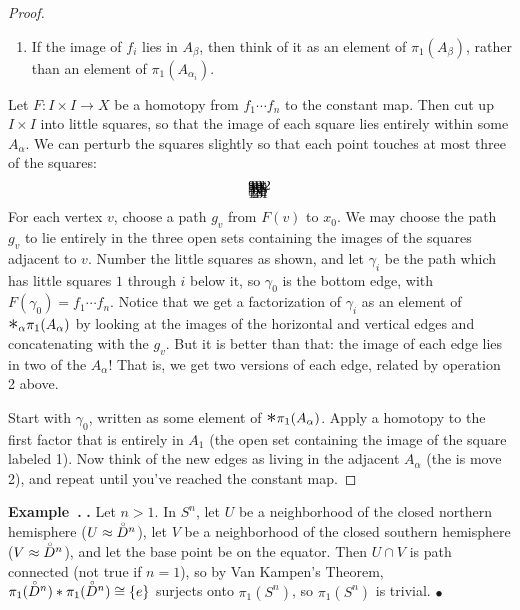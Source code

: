 \documentclass[12pt]{article}
\makeatletter
\theoremstyle{plain}
\theoremstyle{definition}
\newenvironment{example}[1][]{%
    \begin{trivlist} \item[]%
    \refstepcounter{equation}\textbf{Example~\theequation}%
    \@ifnotempty{#1}{\the\thm@notefont \ (#1)}\textbf{.} }%
    {\hspace*{\fill}$\bullet$ \end{trivlist}}
\theoremstyle{remark}
\renewcommand{\theequation}{\thesection.\arabic{equation}}
\newcommand{\bigast}{\text{\Large $\ast$}}
\newcommand{\inn}[1]{\accentset{\circ}{#1}}
\makeatother
\begin{document}
\begin{proof}
\begin{enumerate}
     \item If the image of $f_i$ lies in $A_\beta$, then think of it as an element of
     $\pi_1(A_\beta)$, rather than an element of $\pi_1(A_{\alpha_i})$.
   \end{enumerate}
   Let $F:I\times I\to X$ be a homotopy from $f_1\cdots f_n$ to the constant map. Then
   cut up $I\times I$ into little squares, so that the image of each square lies entirely
   within some $A_\alpha$. We can perturb the squares slightly so that each point touches
   at most three of the squares:
   \[\begin{xy}
     (-1.5,-1) *{1} *=(1,1)\frm{-},
     (-.5,-1) *{2} *=(1,1)\frm{-},
     (.5,-1) *{3} *=(1,1)\frm{-},
     (1.5,-1) *{4} *=(1,1)\frm{-},
     (-1.5,0) *{5} *=(1.1,1)!(-.05,0)\frm{-},
     (-.4,0) *{6} *=(1,1)\frm{-},
     (.6,0) *{7} *=(1,1)\frm{-},
     (1.6,0) *{8} *=(.9,1)!(.05,0)\frm{-},
     (-1.5,1) *{9} *=(1,1)\frm{-},
     (-.5,1) *{10} *=(1,1)\frm{-},
     (.5,1) *{11} *=(1,1)\frm{-},
     (1.5,1) *{12} *=(1,1)\frm{-},
   \end{xy}\]
   For each vertex $v$, choose a path $g_v$ from $F(v)$ to $x_0$. We may choose the path
   $g_v$ to lie entirely in the three open sets containing the images of the squares
   adjacent to $v$. Number the little squares as shown, and let $\gamma_i$ be the path
   which has little squares $1$ through $i$ below it, so $\gamma_0$ is the bottom edge,
   with $F(\gamma_0)=f_1\cdots f_n$. Notice that we get a factorization of $\gamma_i$ as
   an element of $\bigast_\alpha \pi_1(A_\alpha)$ by looking at the images of the
   horizontal and vertical edges and concatenating with the $g_v$. But it is better than
   that: the image of each edge lies in two of the $A_\alpha$! That is, we get two
   versions of each edge, related by operation 2 above.

   Start with $\gamma_0$, written as some element of $\bigast \pi_1(A_\alpha)$. Apply a
   homotopy to the first factor that is entirely in $A_1$ (the open set containing the
   image of the square labeled 1). Now think of the new edges as living in the adjacent
   $A_\alpha$ (the is move 2), and repeat until you've reached the constant map.
 \end{proof}
 \begin{example}
   Let $n>1$. In $S^n$, let $U$ be a neighborhood of the closed northern hemisphere
   ($U\approx \inn D^n$), let $V$ be a neighborhood of the closed southern hemisphere
   ($V\approx \inn D^n$), and let the base point be on the equator. Then $U\cap V$ is
   path connected (not true if $n=1$), so by Van Kampen's Theorem, $\pi_1(\inn D^n)\ast
   \pi_1(\inn D^n)\cong \{e\}$ surjects onto $\pi_1(S^n)$, so $\pi_1(S^n)$ is trivial.
 \end{example}
\end{document}

